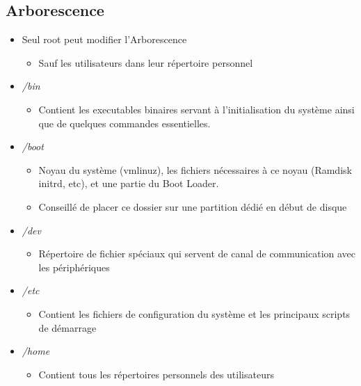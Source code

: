 \documentclass[a4paper]{article}
\begin{document}
    \subsection{Arborescence}
    \begin{itemize}[label=\textbullet, font=\Large]
      \item Seul root peut modifier l'Arborescence
      \begin{itemize}[label=, font=\scriptsize]
        \item Sauf les utilisateurs dans leur répertoire personnel
      \end{itemize}
      \item \emph{/bin}
      \begin{itemize}[label=, font=\scriptsize]
        \item Contient les executables binaires servant à l'initialisation du système ainsi que de quelques commandes essentielles.
      \end{itemize}
      \item \emph{/boot}
      \begin{itemize}[label=, font=\scriptsize]
        \item Noyau du système (vmlinuz), les fichiers nécessaires à ce noyau (Ramdisk initrd, etc), et une partie du Boot Loader.
        \item Conseillé de placer ce dossier sur une partition dédié en début de disque
      \end{itemize}
      \item \emph{/dev}
      \begin{itemize}[label=, font=\scriptsize]
        \item Répertoire de fichier spéciaux qui servent de canal de communication avec les périphériques
      \end{itemize}
      \item \emph{/etc}
      \begin{itemize}[label=, font=\scriptsize]
        \item Contient les fichiers de configuration du système et les principaux scripts de démarrage
      \end{itemize}
      \item \emph{/home}
      \begin{itemize}[label=, font=\scriptsize]
        \item Contient tous les répertoires personnels des utilisateurs
      \end{itemize}

\end{itemize}
\end{document}
